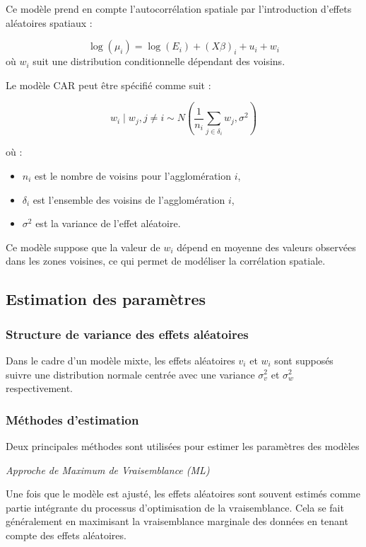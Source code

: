 \documentclass[
]{article}
\providecommand{\tightlist}{%
  \setlength{\itemsep}{0pt}\setlength{\parskip}{0pt}}
\begin{document}
Ce modèle prend en compte l'autocorrélation spatiale par l'introduction
d'effets aléatoires spatiaux :

\[
\log(\mu_i) = \log(E_i) + (X\beta)_i + u_i + w_i
\] où \(w_i\) suit une distribution conditionnelle dépendant des
voisins.

Le modèle CAR peut être spécifié comme suit :

\[
w_i \mid w_j, j \neq i \sim N \left( \frac{1}{n_i} \sum_{j \in \delta_i} w_j, \sigma^2 \right)
\]

où :

\begin{itemize}
\tightlist
\item
  \(n_i\) est le nombre de voisins pour l'agglomération \(i\),
\item
  \(\delta_i\) est l'ensemble des voisins de l'agglomération \(i\),
\item
  \(\sigma^2\) est la variance de l'effet aléatoire.
\end{itemize}

Ce modèle suppose que la valeur de \(w_i\) dépend en moyenne des valeurs
observées dans les zones voisines, ce qui permet de modéliser la
corrélation spatiale.

\subsection{Estimation des
paramètres}\label{estimation-des-paramuxe8tres}

\subsubsection{Structure de variance des effets
aléatoires}\label{structure-de-variance-des-effets-aluxe9atoires}

Dans le cadre d'un modèle mixte, les effets aléatoires \(v_i\) et
\(w_i\) sont supposés suivre une distribution normale centrée avec une
variance \(\sigma_v^2\) et \(\sigma_w^2\) respectivement.

\subsubsection{Méthodes d'estimation}\label{muxe9thodes-destimation}

Deux principales méthodes sont utilisées pour estimer les paramètres des
modèles

\emph{Approche de Maximum de Vraisemblance (ML)}

Une fois que le modèle est ajusté, les effets aléatoires sont souvent
estimés comme partie intégrante du processus d'optimisation de la
vraisemblance. Cela se fait généralement en maximisant la vraisemblance
marginale des données en tenant compte des effets aléatoires.
\end{document}
